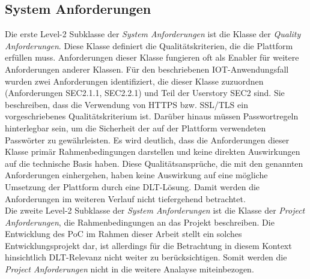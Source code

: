 \subsection{System Anforderungen}
\label{subsec:requirements:evaluation:system}
Die erste Level-2 Subklasse der \textit{System Anforderungen} ist die Klasse der \textit{Quality Anforderungen}. Diese Klasse definiert die Qualitätskriterien, die die Plattform erfüllen muss. Anforderungen dieser Klasse fungieren oft als Enabler für weitere Anforderungen anderer Klassen. Für den beschriebenen IOT-Anwendungsfall wurden zwei Anforderungen identifiziert, die dieser Klasse zuzuordnen (Anforderungen SEC2.1.1, SEC2.2.1) und Teil der Userstory SEC2 sind. Sie beschreiben, dass die Verwendung von HTTPS bzw. SSL/TLS ein vorgeschriebenes Qualitätskriterium ist. Darüber hinaus müssen Passwortregeln hinterlegbar sein, um die Sicherheit der auf der Plattform verwendeten Passwörter zu gewährleisten. Es wird deutlich, dass die Anforderungen dieser Klasse primär Rahmenbedingungen darstellen und keine direkten Auswirkungen auf die technische Basis haben. Diese Qualitätsansprüche, die mit den genannten Anforderungen einhergehen, haben keine Auswirkung auf eine mögliche Umsetzung der Plattform durch eine \ac{DLT}-Lösung. Damit werden die Anforderungen im weiteren Verlauf nicht tiefergehend betrachtet.\\

Die zweite Level-2 Subklasse der \textit{System Anforderungen} ist die Klasse der \textit{Project Anforderungen}, die Rahmenbedingungen an das Projekt beschreiben. Die Entwicklung des \ac{PoC} im Rahmen dieser Arbeit stellt ein solches Entwicklungsprojekt dar, ist allerdings für die Betrachtung in diesem Kontext hinsichtlich \ac{DLT}-Relevanz nicht weiter zu berücksichtigen. Somit werden die \textit{Project Anforderungen} nicht in die weitere Analayse miteinbezogen.\\

